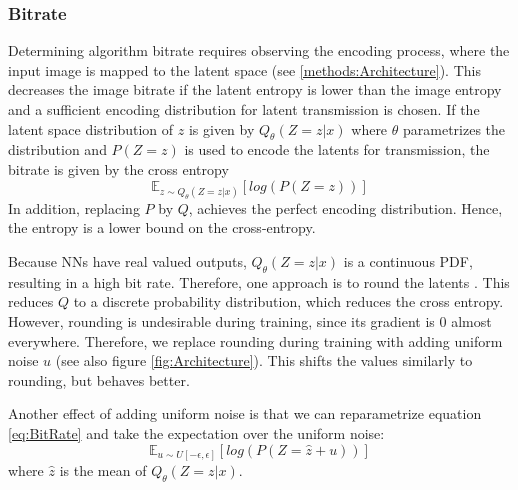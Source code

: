     \subsubsection{Bitrate}
        Determining algorithm bitrate requires observing the encoding
        process, where the input image is mapped to the
        latent space (see \ref{methods:Architecture}). This decreases the
        image bitrate if the latent entropy is lower than the image entropy and a sufficient encoding distribution for latent transmission is chosen. If the latent
        space distribution of $z$ is given by $Q_\theta(Z=z \vert x)$ where $\theta$
        parametrizes the distribution and $P(Z=z)$ is used to encode the latents for transmission, the bitrate is given by the cross entropy
        \begin{equation}\label{eq:BitRate}
            \mathbb{E}_{z \sim Q_\theta(Z=z \vert x)}[log(P(Z=z))]
        \end{equation}
        In addition, replacing $P$ by $Q$, achieves the perfect encoding distribution. Hence, the
        entropy is a lower bound on the cross-entropy.

        Because NNs have real valued outputs, ${Q_\theta(Z=z\vert x)}$
         is a continuous PDF, resulting in a high bit rate. Therefore, one
        approach is to round the latents \cite{DBLP:journals/corr/BalleLS16a}. This reduces $Q$ to a discrete
        probability distribution, which reduces the cross entropy. However, rounding
        is undesirable during training, since its gradient is 0 almost everywhere. Therefore, we replace
        rounding during training with adding uniform noise $u$ (see also
        figure \ref{fig:Architecture}). This shifts the values
        similarly to rounding, but behaves better.

        Another effect of adding uniform noise is that we can reparametrize equation
        \ref{eq:BitRate} and take the expectation over the uniform noise:
        \begin{equation}
            \mathbb{E}_{u \sim U[-\epsilon, \epsilon]}[log(P(Z=\hat{z} + u))]
        \end{equation}
        where $\hat{z}$ is the mean of $Q_\theta(Z=z \vert x)$. \newline



